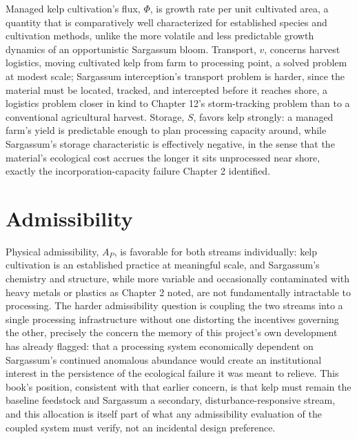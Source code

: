 \documentclass[11pt,oneside]{book}
\begin{document}
Managed kelp cultivation's flux, $\Phi$, is growth rate per unit cultivated area, a quantity that is comparatively well characterized for established species and cultivation methods, unlike the more volatile and less predictable growth dynamics of an opportunistic Sargassum bloom. Transport, $v$, concerns harvest logistics, moving cultivated kelp from farm to processing point, a solved problem at modest scale; Sargassum interception's transport problem is harder, since the material must be located, tracked, and intercepted before it reaches shore, a logistics problem closer in kind to Chapter 12's storm-tracking problem than to a conventional agricultural harvest. Storage, $S$, favors kelp strongly: a managed farm's yield is predictable enough to plan processing capacity around, while Sargassum's storage characteristic is effectively negative, in the sense that the material's ecological cost accrues the longer it sits unprocessed near shore, exactly the incorporation-capacity failure Chapter 2 identified.

\section*{Admissibility}

Physical admissibility, $A_P$, is favorable for both streams individually: kelp cultivation is an established practice at meaningful scale, and Sargassum's chemistry and structure, while more variable and occasionally contaminated with heavy metals or plastics as Chapter 2 noted, are not fundamentally intractable to processing. The harder admissibility question is coupling the two streams into a single processing infrastructure without one distorting the incentives governing the other, precisely the concern the memory of this project's own development has already flagged: that a processing system economically dependent on Sargassum's continued anomalous abundance would create an institutional interest in the persistence of the ecological failure it was meant to relieve. This book's position, consistent with that earlier concern, is that kelp must remain the baseline feedstock and Sargassum a secondary, disturbance-responsive stream, and this allocation is itself part of what any admissibility evaluation of the coupled system must verify, not an incidental design preference.
\end{document}
